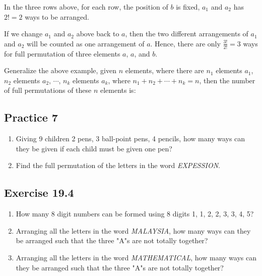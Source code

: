 \documentclass{report}
\begin{document}
\begin{multicols}{2}
  In the three rows above, for each row, the position of $b$ is fixed, $a_1$ and
  $a_2$ has $2! = 2$ ways to be arranged.

  If we change $a_1$ and $a_2$ above back to $a$, then the two different
  arrangements of $a_1$ and $a_2$ will be counted as one arrangement of $a$.
  Hence, there are only $\frac{3!}{2!} = 3$ ways for full permutation of three
  elements $a$, $a$, and $b$.

  Generalize the above example, given $n$ elements, where there are $n_1$
  elements $a_1$, $n_2$ elements $a_2$, $\cdots$, $n_k$ elements $a_k$, where
  $n_1 + n_2 + \cdots + n_k = n$, then the number of full permutations of these
  $n$ elements is:
  \begin{cequation}
  \end{cequation}

  \subsection{Practice 7}

  \begin{enumerate}
    \item Giving 9 children 2 pens, 3 ball-point pens, 4 pencils, how many ways can they
          be given if each child must be given one pen?

    \item Find the full permutation of the letters in the word \textit{EXPESSION}.
  \end{enumerate}

  \subsection{Exercise 19.4}

  \begin{enumerate}
    \item How many 8 digit numbers can be formed using 8 digits 1, 1, 2, 2, 3, 3, 4, 5?

    \item Arranging all the letters in the word \textit{MALAYSIA}, how many ways can they
          be arranged such that the three "A"s are not totally together?

    \item Arranging all the letters in the word \textit{MATHEMATICAL}, how many ways can
          they be arranged such that the three "A"s are not totally together?


\end{enumerate}
\end{multicols}
\end{document}
